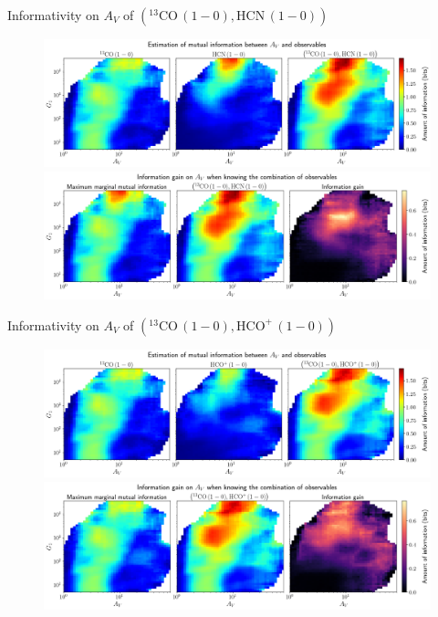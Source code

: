 \documentclass{beamer}
\begin{document}
\begin{frame}{Informativity on $A_V$ of $\left(\mathrm{^{13}CO\,(1-0)},\mathrm{HCN\,(1-0)}\right)$}
    \begin{figure}
        \centering
        \includegraphics[width=0.95\linewidth]{../mi/av__13co10_hcn10_mi.png}
        \vfill
        \includegraphics[width=0.95\linewidth]{../mi/av__13co10_hcn10_mi_gain.png}
    \end{figure}
\end{frame}

\begin{frame}{Informativity on $A_V$ of $\left(\mathrm{^{13}CO\,(1-0)},\mathrm{HCO^+\,(1-0)}\right)$}
    \begin{figure}
        \centering
        \includegraphics[width=0.95\linewidth]{../mi/av__13co10_hcop10_mi.png}
        \vfill
        \includegraphics[width=0.95\linewidth]{../mi/av__13co10_hcop10_mi_gain.png}
    \end{figure}
\end{frame}
\end{document}
